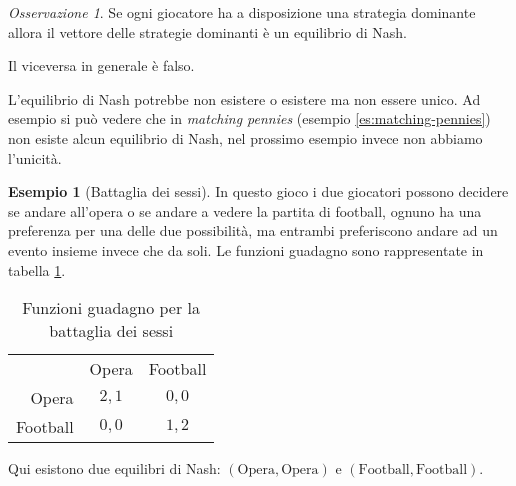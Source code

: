 \documentclass[a4paper]{article}
\newcounter{counter1}
\theoremstyle{plain}
\theoremstyle{definition}
\newtheorem{myes}[counter1]{Esempio}
\theoremstyle{remark}
\newtheorem{myoss}[counter1]{Osservazione}
\newcommand{\pa}[1]{\left(#1\right)}
\begin{document}
\begin{myoss}
  Se ogni giocatore ha a disposizione una strategia dominante allora
  il vettore delle strategie dominanti è un equilibrio di Nash.
  
  Il viceversa in generale è falso.
\end{myoss}

L'equilibrio di Nash potrebbe non esistere o esistere ma non essere
unico. Ad esempio si può vedere che in \textit{matching pennies}
(esempio \ref{es:matching-pennies}) non esiste alcun equilibrio di
Nash, nel prossimo esempio invece non abbiamo l'unicità.

\begin{myes}[Battaglia dei sessi]
  In questo gioco i due giocatori possono decidere se andare all'opera
  o se andare a vedere la partita di football, ognuno ha una
  preferenza per una delle due possibilità, ma entrambi preferiscono
  andare ad un evento insieme invece che da soli. Le funzioni guadagno
  sono rappresentate in tabella \ref{tab:u1u2-sessi}.
  
  \begin{table}[!ht]
    \centering
    \begin{tabular}{rcc}
      & Opera & Football \\
      \cline{2-3}
      Opera & \multicolumn{1}{|c|}{$2,1$} & \multicolumn{1}{|c|}{$0,0$}  \\
      \cline{2-3}
      Football & \multicolumn{1}{|c|}{$0,0$} & \multicolumn{1}{|c|}{$1,2$}  \\
      \cline{2-3}
    \end{tabular}
    \caption{Funzioni guadagno per la battaglia dei sessi}
    \label{tab:u1u2-sessi}
  \end{table}
  
  Qui esistono due equilibri di Nash: $\pa{\text{Opera},\text{Opera}}$
  e $\pa{\text{Football},\text{Football}}$.
\end{myes}




\end{document}
